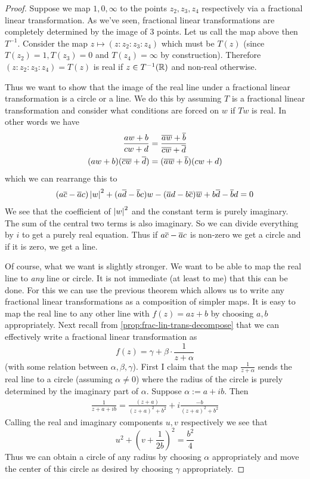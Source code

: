 \begin{proof}
Suppose we map $1, 0, \infty$ to the points $z_2, z_3, z_4$ respectively via a fractional linear transformation. As we've seen, fractional linear transformations are completely determined by the image of 3 points. Let us call the map above then $T^{-1}$. Consider the map $z \mapsto (z:z_2:z_3:z_4)$ which must be $T(z)$ (since $T(z_2) = 1, T(z_3) = 0$ and $T(z_4) = \infty$ by construction). Therefore $(z:z_2:z_3:z_4) = T(z)$ is real if $z \in T^{-1}(\mathbb{R})$ and non-real otherwise. 

Thus we want to show that the image of the real line under a fractional linear transformation is a circle or a line. We do this by assuming $T$ is a fractional linear transformation and consider what conditions are forced on $w$ if $Tw$ is real.
In other words we have
\begin{align*}
    \frac{aw + b}{cw + d} &= \frac{\overline{a} \overline{w} + \overline{b}}{\overline{c} \overline{w} + \overline{d}}\\
    (aw + b)(\overline{c} \overline{w} + \overline{d}) &= (\overline{a} \overline{w} + \overline{b})(cw + d)
\end{align*}
which we can rearrange this to
\begin{align*}
    (a \overline{c} - \overline{a} c) \left|w\right|^2 + (a\overline{d} - \overline{b}c)w - (\overline{a}d - b\overline{c})\overline{w} + b\overline{d} - \overline{b}d = 0
\end{align*}
We see that the coefficient of $\left|w\right|^2$ and the constant term is purely imaginary. The sum of the central two terms is also imaginary. So we can divide everything by $i$ to get a purely real equation. Thus if $a\overline{c} - \overline{a}c$ is non-zero we get a circle and if it is zero, we get a line.

Of course, what we want is slightly stronger. We want to be able to map the real line to \textit{any} line or circle. It is not immediate (at least to me) that this can be done. For this we can use the previous theorem which allows us to write any fractional linear transformations as a composition of simpler maps. It is easy to map the real line to any other line with $f(z) = az + b$ by choosing $a, b$ appropriately. Next recall from \autoref{prop:frac-lin-trans-decompose} that we can effectively write a fractional linear transformation as 
\begin{equation*}
    f(z) = \gamma + \beta \cdot \frac{1}{z + \alpha}
\end{equation*}
(with some relation between $\alpha, \beta, \gamma$). First I claim that the map $\frac{1}{z +\alpha}$ sends the real line to a circle (assuming $\alpha \neq 0$) where the radius of the circle is purely determined by the imaginary part of $\alpha$. Suppose $\alpha := a + ib$. Then
\begin{align*}
    \frac{1}{z + a + ib} = \frac{(z + a)}{(z + a)^2 + b^2} + i \frac{-b}{(z + a)^2 + b^2}
\end{align*}
Calling the real and imaginary components $u, v$ respectively we see that
$$ u^2 + \left( v + \frac{1}{2b} \right)^2 = \frac{b^2}{4} $$
Thus we can obtain a circle of any radius by choosing $\alpha$ appropriately and move the center of this circle as desired by choosing $\gamma$ appropriately.
\end{proof}

